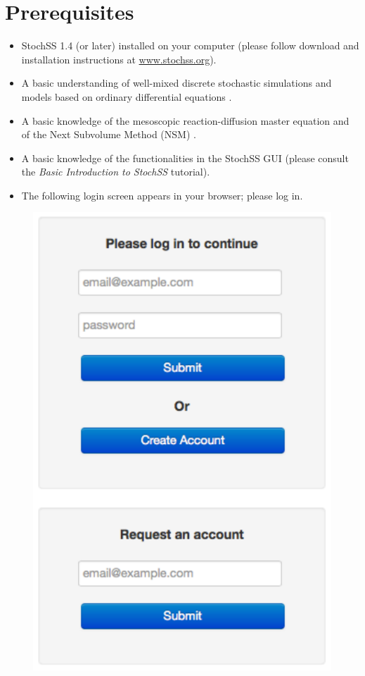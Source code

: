 \section{Prerequisites}

\begin{itemize}
\item StochSS 1.4 (or later) installed on your computer (please follow download and installation instructions at \url{www.stochss.org}). 
\item A basic understanding of well-mixed discrete stochastic simulations and models based on ordinary differential equations \cite{dan,sundials}.
\item A basic knowledge of the mesoscopic reaction-diffusion master equation and of the Next Subvolume Method (NSM) \cite{nsm}.
\item A basic knowledge of the functionalities in the StochSS GUI (please consult the \textit{Basic Introduction to StochSS} tutorial).
\item The following login screen appears in your browser; please log in.
\end{itemize}

\begin{figure}[!ht]
\centering
\includegraphics[scale=0.55]{T6/user-login.pdf}
\end{figure}
